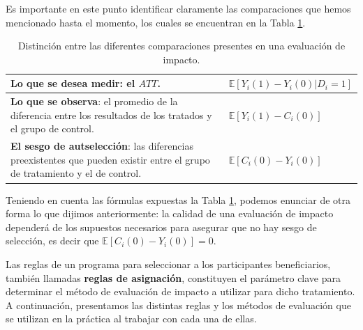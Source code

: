 \documentclass[../../main.tex]{subfiles}
\begin{document}
\bigskip
Es importante en este punto identificar claramente las comparaciones que hemos
mencionado hasta el momento, los cuales se encuentran en la Tabla \ref{tab:distinciones}.
\begin{table}[h!]
    \centering
    \begin{tabular}{p{7cm}m{7cm}}  %
        \hline
        \textbf{Lo que se desea medir}: el \(ATT\). & \(\mathbb{E} \left[Y_i(1)-Y_i(0)|D_i=1\right]\) \\
        \hline
        \textbf{Lo que se observa}: el promedio de la diferencia entre los resultados de
        los tratados y el grupo de control. & \(\mathbb{E} \left[Y_i(1)-C_i(0)\right]\) \\
        \hline
        \textbf{El sesgo de autselección}: las diferencias preexistentes que pueden existir
        entre el grupo de tratamiento y el de control. & \(\mathbb{E} \left[C_i(0)-Y_i(0)\right]\) \\
        \hline
    \end{tabular}
    \caption{Distinción entre las diferentes comparaciones presentes en una evaluación de impacto.}
    \label{tab:distinciones}
\end{table}

Teniendo en cuenta las fórmulas expuestas la Tabla \ref{tab:distinciones}, podemos
enunciar de otra forma lo que dijimos anteriormente: la calidad de una evaluación de
impacto dependerá de los supuestos necesarios para asegurar que no hay sesgo de selección,
es decir que \(\mathbb{E} \left[C_i(0)-Y_i(0)\right] = 0\).

\bigskip
Las reglas de un programa para seleccionar a los participantes beneficiarios, también
llamadas \textbf{reglas de asignación}, constituyen el parámetro clave para determinar el
método de evaluación de impacto a utilizar para dicho tratamiento. A continuación,
presentamos las distintas reglas y los métodos de evaluación que se utilizan en la
práctica al trabajar con cada una de ellas.
\end{document}
